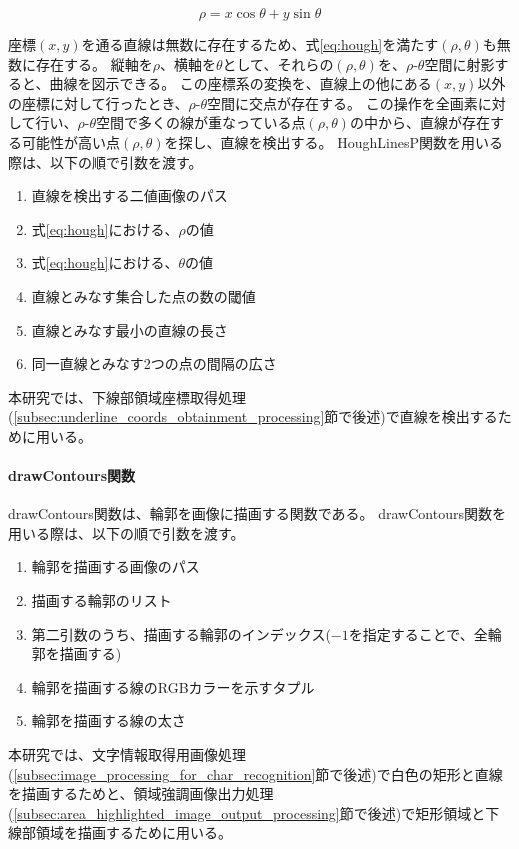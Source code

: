 \begin{equation}\label{eq:hough}
	\rho = x\cos\theta + y\sin\theta
\end{equation}

座標$(x, y)$を通る直線は無数に存在するため、式\ref{eq:hough}を満たす$(\rho, \theta)$も無数に存在する。
縦軸を$\rho$、横軸を$\theta$として、それらの$(\rho, \theta)$を、$\rho$-$\theta$空間に射影すると、曲線を図示できる。
この座標系の変換を、直線上の他にある$(x, y)$以外の座標に対して行ったとき、$\rho$-$\theta$空間に交点が存在する。
この操作を全画素に対して行い、$\rho$-$\theta$空間で多くの線が重なっている点$(\rho, \theta)$の中から、直線が存在する可能性が高い点$(\rho, \theta)$を探し、直線を検出する。
HoughLinesP関数を用いる際は、以下の順で引数を渡す\cite{HoughLinesP関数の引数}。
\begin{enumerate}
	\item 直線を検出する二値画像のパス
	\item 式\ref{eq:hough}における、$\rho$の値
	\item 式\ref{eq:hough}における、$\theta$の値
	\item 直線とみなす集合した点の数の閾値
	\item 直線とみなす最小の直線の長さ
	\item 同一直線とみなす2つの点の間隔の広さ
\end{enumerate}
本研究では、下線部領域座標取得処理(\ref{subsec:underline_coords_obtainment_processing}節で後述)で直線を検出するために用いる。

\paragraph{drawContours関数}
drawContours関数は、輪郭を画像に描画する関数である。
drawContours関数を用いる際は、以下の順で引数を渡す\cite{輪郭描画}。
\begin{enumerate}
	\item 輪郭を描画する画像のパス
	\item 描画する輪郭のリスト
	\item 第二引数のうち、描画する輪郭のインデックス($-1$を指定することで、全輪郭を描画する)
	\item 輪郭を描画する線のRGBカラーを示すタプル
	\item 輪郭を描画する線の太さ
\end{enumerate}
本研究では、文字情報取得用画像処理(\ref{subsec:image_processing_for_char_recognition}節で後述)で白色の矩形と直線を描画するためと、領域強調画像出力処理(\ref{subsec:area_highlighted_image_output_processing}節で後述)で矩形領域と下線部領域を描画するために用いる。

